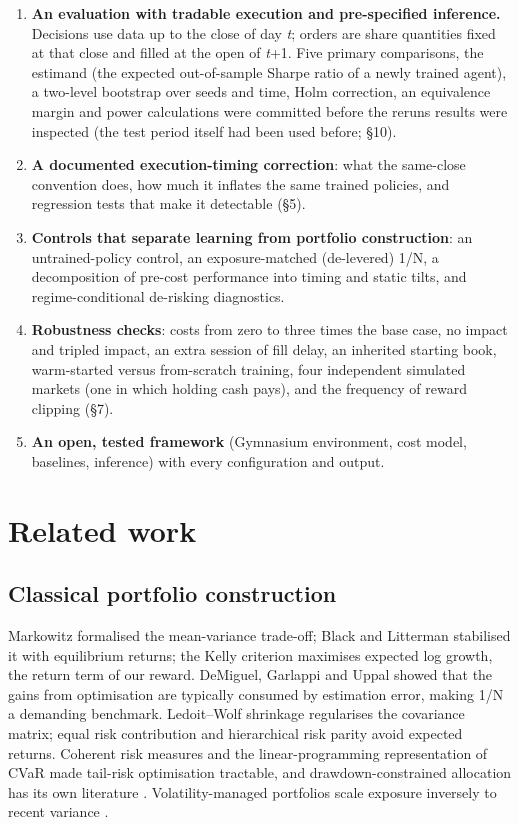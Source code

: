 \documentclass[11pt]{article}
\providecommand{\tightlist}{\setlength{\itemsep}{0pt}\setlength{\parskip}{0pt}}
\begin{document}
\begin{enumerate}
\tightlist
\item
  \textbf{An evaluation with tradable execution and pre-specified inference.} Decisions use data up to the close of day \emph{t}; orders are share quantities fixed at that close and filled at the open of \emph{t}+1. Five primary comparisons, the estimand (the expected out-of-sample Sharpe ratio of a newly trained agent), a two-level bootstrap over seeds and time, Holm correction, an equivalence margin and power calculations were committed before the rerun\textquotesingle s results were inspected (the test period itself had been used before; \S{}10).
\item
  \textbf{A documented execution-timing correction}: what the same-close convention does, how much it inflates the same trained policies, and regression tests that make it detectable (\S{}5).
\item
  \textbf{Controls that separate learning from portfolio construction}: an untrained-policy control, an exposure-matched (de-levered) 1/N, a decomposition of pre-cost performance into timing and static tilts, and regime-conditional de-risking diagnostics.
\item
  \textbf{Robustness checks}: costs from zero to three times the base case, no impact and tripled impact, an extra session of fill delay, an inherited starting book, warm-started versus from-scratch training, four independent simulated markets (one in which holding cash pays), and the frequency of reward clipping (\S{}7).
\item
  \textbf{An open, tested framework} (Gymnasium environment, cost model, baselines, inference) with every configuration and output.
\end{enumerate}

\section{Related work}\label{s2}

\subsection{Classical portfolio construction}\label{classical-portfolio-construction}

Markowitz \cite{r1} formalised the mean-variance trade-off; Black and Litterman \cite{r2} stabilised it with equilibrium returns; the Kelly criterion \cite{r3} maximises expected log growth, the return term of our reward. DeMiguel, Garlappi and Uppal \cite{r4} showed that the gains from optimisation are typically consumed by estimation error, making 1/N a demanding benchmark. Ledoit--Wolf shrinkage \cite{r5} regularises the covariance matrix; equal risk contribution \cite{r6,r7} and hierarchical risk parity \cite{r8} avoid expected returns. Coherent risk measures \cite{r11} and the linear-programming representation of CVaR \cite{r9,r10} made tail-risk optimisation tractable, and drawdown-constrained allocation has its own literature \cite{r36,r37}. Volatility-managed portfolios scale exposure inversely to recent variance \cite{r45}.
\end{document}
